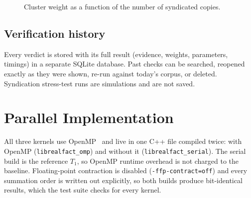 \documentclass[conference,a4paper]{IEEEtran}
\begin{document}
\begin{figure}[!t]
\centering
{}
\caption{Cluster weight as a function of the number of syndicated copies.}
\label{fig:weights}
\end{figure}

\subsection{Verification history}
Every verdict is stored with its full result (evidence, weights, parameters, timings) in a separate SQLite database.
Past checks can be searched, reopened exactly as they were shown, re-run against today's corpus, or deleted.
Syndication stress-test runs are simulations and are not saved.

\section{Parallel Implementation}
\label{sec:par}

All three kernels use OpenMP~\cite{openmp} and live in one C++ file compiled twice: with OpenMP (\texttt{librealfact\_omp}) and without it
(\texttt{librealfact\_serial}). The serial build is the reference $T_1$, so OpenMP runtime overhead is not charged to
the baseline. Floating-point contraction is disabled (\texttt{-ffp-contract=off}) and every summation order is written
out explicitly, so both builds produce bit-identical results, which the test suite checks for every kernel.
\end{document}
